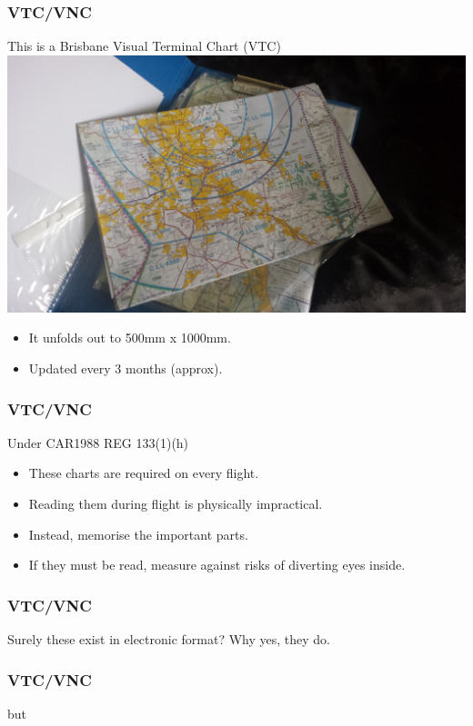 \begin{frame}
\frametitle{VTC/VNC}
\begin{block}{This is a Brisbane Visual Terminal Chart (VTC)}
\includegraphics[height=0.3\textheight]{image/vtc.png}
\begin{itemize}
\item<1-> It unfolds out to 500mm x 1000mm.
\item<2-> Updated every 3 months (approx).
\end{itemize}
\end{block}
\end{frame}

\begin{frame}
\frametitle{VTC/VNC}
\begin{block}{Under CAR1988 REG 133(1)(h)}
\begin{itemize}
\item<1-> These charts are required on every flight.
\item<2-> Reading them during flight is physically impractical.
\item<3-> Instead, memorise the important parts.
\item<4-> If they must be read, measure against risks of diverting eyes inside.
\end{itemize}
\end{block}
\end{frame}

\begin{frame}
\frametitle{VTC/VNC}
\begin{block}{Surely these exist in electronic format?}
Why yes, they do.
\end{block}
\end{frame}

\begin{frame}
\frametitle{VTC/VNC}
\large
\begin{center}
but
\end{center}
\end{frame}

